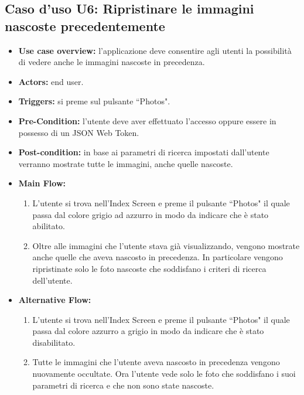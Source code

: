 \subsection*{Caso d'uso U6: Ripristinare le immagini nascoste precedentemente}
\begin{itemize}
    \item  \textbf{Use case overview:} l'applicazione deve consentire agli utenti la possibilit\`a di vedere anche le immagini nascoste in precedenza.
    \item \textbf{Actors:} end user.
    \item \textbf{Triggers:} si preme sul pulsante ``Photos".
    \item \textbf{Pre-Condition:} l'utente deve aver effettuato l'accesso oppure essere in possesso di un JSON Web Token.
    \item \textbf{Post-condition:} in base ai parametri di ricerca impostati dall'utente verranno mostrate tutte le immagini, anche quelle nascoste.
    \item \textbf{Main Flow:} \begin{enumerate}
              \item L'utente si trova nell'Index Screen e preme il pulsante ``Photos" il quale passa dal colore grigio ad azzurro in modo da indicare che \`e stato abilitato.
              \item Oltre alle immagini che l'utente stava gi\`a visualizzando, vengono mostrate anche quelle che aveva nascosto in precedenza. In particolare vengono ripristinate solo le foto nascoste che soddisfano i criteri di ricerca dell'utente.
          \end{enumerate}
    \item \textbf{Alternative Flow:}\begin{enumerate}
              \item L'utente si trova nell'Index Screen e preme il pulsante ``Photos" il quale passa dal colore azzurro a grigio in modo da indicare che \`e stato disabilitato.
              \item Tutte le immagini che l'utente aveva nascosto in precedenza vengono nuovamente occultate. Ora l'utente vede solo le foto che soddisfano i suoi parametri di ricerca e che non sono state nascoste.

          \end{enumerate}
\end{itemize}
